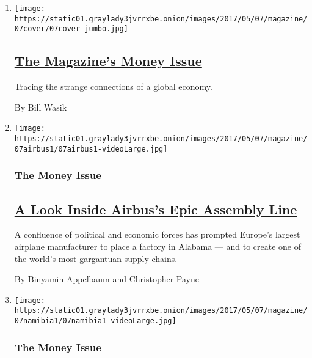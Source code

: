 \begin{enumerate}
\def\labelenumi{\arabic{enumi}.}
\item
  \texttt{[image: https://static01.graylady3jvrrxbe.onion/images/2017/05/07/magazine/07cover/07cover-jumbo.jpg]}

  \hypertarget{the-magazines-money-issue}{%
  \subsection{\texorpdfstring{\href{/2017/05/04/magazine/the-magazines-money-issue.html}{The
  Magazine's Money
  Issue}}{The Magazine's Money Issue}}\label{the-magazines-money-issue}}

  Tracing the strange connections of a global economy.

  By Bill Wasik
\item
  \texttt{[image: https://static01.graylady3jvrrxbe.onion/images/2017/05/07/magazine/07airbus1/07airbus1-videoLarge.jpg]}

  \hypertarget{the-money-issue-2}{%
  \subsubsection{The Money Issue}\label{the-money-issue-2}}

  \hypertarget{a-look-inside-airbuss-epic-assembly-line}{%
  \subsection{\texorpdfstring{\href{/2017/05/03/magazine/a-look-inside-airbuss-epic-assembly-line.html}{A
  Look Inside Airbus's Epic Assembly
  Line}}{A Look Inside Airbus's Epic Assembly Line}}\label{a-look-inside-airbuss-epic-assembly-line}}

  A confluence of political and economic forces has prompted Europe's
  largest airplane manufacturer to place a factory in Alabama --- and to
  create one of the world's most gargantuan supply chains.

  By Binyamin Appelbaum and Christopher Payne
\item
  \texttt{[image: https://static01.graylady3jvrrxbe.onion/images/2017/05/07/magazine/07namibia1/07namibia1-videoLarge.jpg]}

  \hypertarget{the-money-issue-3}{%
  \subsubsection{The Money Issue}\label{the-money-issue-3}}


\end{enumerate}
